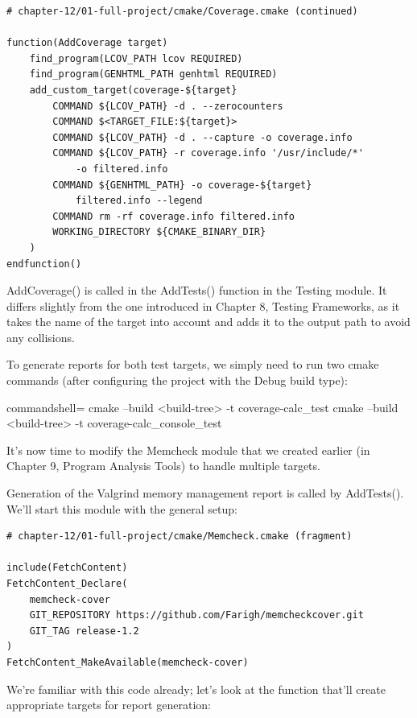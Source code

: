 \begin{lstlisting}[style=styleCMake]
# chapter-12/01-full-project/cmake/Coverage.cmake (continued)

function(AddCoverage target)
	find_program(LCOV_PATH lcov REQUIRED)
	find_program(GENHTML_PATH genhtml REQUIRED)
	add_custom_target(coverage-${target}
		COMMAND ${LCOV_PATH} -d . --zerocounters
		COMMAND $<TARGET_FILE:${target}>
		COMMAND ${LCOV_PATH} -d . --capture -o coverage.info
		COMMAND ${LCOV_PATH} -r coverage.info '/usr/include/*'
			-o filtered.info
		COMMAND ${GENHTML_PATH} -o coverage-${target}
			filtered.info --legend
		COMMAND rm -rf coverage.info filtered.info
		WORKING_DIRECTORY ${CMAKE_BINARY_DIR}
	)
endfunction()
\end{lstlisting}

AddCoverage() is called in the AddTests() function in the Testing module. It differs slightly from the one introduced in Chapter 8, Testing Frameworks, as it takes the name of the target into account and adds it to the output path to avoid any collisions.

To generate reports for both test targets, we simply need to run two cmake commands (after configuring the project with the Debug build type):

\begin{tcblisting}{commandshell={}}
cmake --build <build-tree> -t coverage-calc_test
cmake --build <build-tree> -t coverage-calc_console_test
\end{tcblisting}

It's now time to modify the Memcheck module that we created earlier (in Chapter 9, Program Analysis Tools) to handle multiple targets.


Generation of the Valgrind memory management report is called by AddTests(). We'll start this module with the general setup:

\begin{lstlisting}[style=styleCMake]
# chapter-12/01-full-project/cmake/Memcheck.cmake (fragment)

include(FetchContent)
FetchContent_Declare(
	memcheck-cover
	GIT_REPOSITORY https://github.com/Farigh/memcheckcover.git
	GIT_TAG release-1.2
)
FetchContent_MakeAvailable(memcheck-cover)
\end{lstlisting}

We're familiar with this code already; let's look at the function that'll create appropriate targets for report generation:

